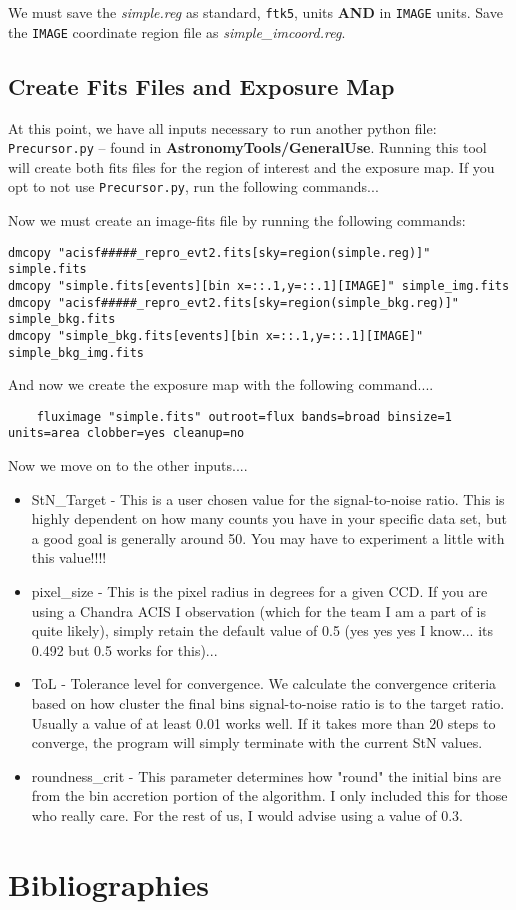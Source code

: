 \documentclass[11pt,letterpaper]{article}
\begin{document}
We must save the \textit{simple.reg} as standard, \texttt{ftk5}, units \textbf{AND} in \texttt{IMAGE} units. Save the \texttt{IMAGE} coordinate region file as \textit{simple\_imcoord.reg}.

\subsection{Create Fits Files and Exposure Map}

At this point, we have all inputs necessary to run another python file: \texttt{Precursor.py} -- found in \textbf{AstronomyTools/GeneralUse}. Running this tool will create both fits files for the region of interest and the exposure map. If you opt to not use \texttt{Precursor.py}, run the following commands...


Now we must create an image-fits file by running the following commands:
\begin{lstlisting}
dmcopy "acisf#####_repro_evt2.fits[sky=region(simple.reg)]" simple.fits
dmcopy "simple.fits[events][bin x=::.1,y=::.1][IMAGE]" simple_img.fits
dmcopy "acisf#####_repro_evt2.fits[sky=region(simple_bkg.reg)]" simple_bkg.fits
dmcopy "simple_bkg.fits[events][bin x=::.1,y=::.1][IMAGE]" simple_bkg_img.fits
\end{lstlisting}

And now we create the exposure map with the following command....

\begin{lstlisting}
	fluximage "simple.fits" outroot=flux bands=broad binsize=1 units=area clobber=yes cleanup=no
\end{lstlisting}

Now we move on to the other inputs....
\begin{itemize}
	\item StN\_Target - This is a user chosen value for the signal-to-noise ratio. This is highly dependent on how many counts you have in your specific data set, but a good goal is generally around 50. You may have to experiment a little with this value!!!!
	\item pixel\_size - This is the pixel radius in degrees for a given CCD. If you are using a Chandra ACIS I observation (which for the team I am a part of is quite likely), simply retain the default value of 0.5 (yes yes yes I know... its 0.492 but 0.5 works for this)...
	\item ToL - Tolerance level for convergence. We calculate the convergence criteria based on how cluster the final bins signal-to-noise ratio is to the target ratio. Usually a value of at least 0.01 works well. If it takes more than $20$ steps to converge, the program will simply terminate with the current StN values.
	\item roundness\_crit - This parameter determines how "round" the initial bins are from the bin accretion portion of the algorithm. I only included this for those who really care. For the rest of us, I would advise using a value of $0.3$.
\end{itemize}
\newpage

\section*{Bibliographies}


\end{document}
